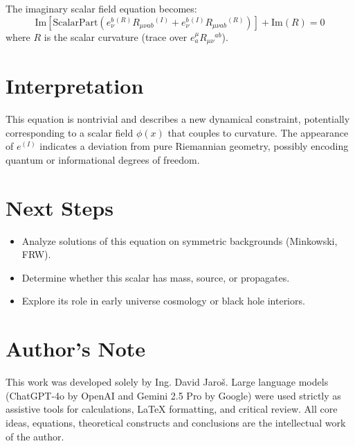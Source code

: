 \documentclass[12pt]{article}
\begin{document}
The imaginary scalar field equation becomes:
\[
\text{Im} \left[ \text{ScalarPart} \left( e^b_\nu{}^{(R)} R_{\mu\nu ab}{}^{(I)} + e^b_\nu{}^{(I)} R_{\mu\nu ab}{}^{(R)} \right) \right] + \text{Im}(R) = 0
\]
where $R$ is the scalar curvature (trace over $e^\mu_a R_{\mu\nu}{}^{ab}$).

\section*{Interpretation}

This equation is nontrivial and describes a new dynamical constraint, potentially corresponding to a scalar field $\phi(x)$ that couples to curvature. The appearance of $e^{(I)}$ indicates a deviation from pure Riemannian geometry, possibly encoding quantum or informational degrees of freedom.

\section*{Next Steps}

\begin{itemize}
\item Analyze solutions of this equation on symmetric backgrounds (Minkowski, FRW).
\item Determine whether this scalar has mass, source, or propagates.
\item Explore its role in early universe cosmology or black hole interiors.
\end{itemize}


\section*{Author's Note}

This work was developed solely by Ing. David Jaroš.  
Large language models (ChatGPT-4o by OpenAI and Gemini 2.5 Pro by Google) were used strictly as assistive tools for calculations, LaTeX formatting, and critical review.  
All core ideas, equations, theoretical constructs and conclusions are the intellectual work of the author.
\end{document}
